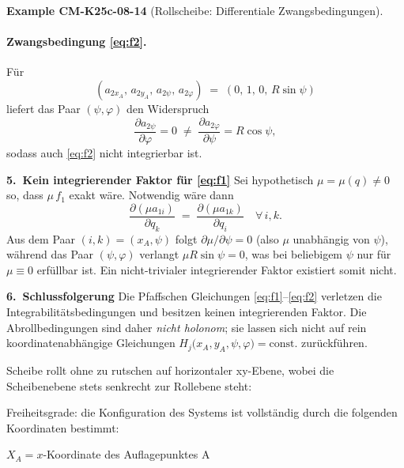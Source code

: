 \documentclass[10pt, letterpaper]{article}
\newcommand{\CustomHeading}[3]{%
  \par\medskip\noindent%
  \textbf{#1 #2} \textnormal{(#3)}.\enskip%
}
\newenvironment{EXA}[2]{\begin{unitbox}\CustomHeading{Example}{#1}{#2}}{\end{unitbox}}
\begin{document}
\begin{EXA}{CM-K25c-08-14}{Rollscheibe: Differentiale Zwangsbedingungen}
\paragraph{Zwangsbedingung \eqref{eq:f2}.}
Für
\[
  (a_{2x_A},\,a_{2y_A},\,a_{2\psi},\,a_{2\varphi})
  \;=\;
  (0,\,1,\,0,\,R\sin\psi)
\]
liefert das Paar $(\psi,\varphi)$ den Widerspruch
\[
  \frac{\partial a_{2\psi}}{\partial\varphi}=0
  \;\neq\;
  \frac{\partial a_{2\varphi}}{\partial\psi}=R\cos\psi,
\]
sodass auch \eqref{eq:f2} nicht integrierbar ist.

\textbf{5.\ Kein integrierender Faktor für \eqref{eq:f1}}
Sei hypothetisch $\mu=\mu(q)\neq0$ so, dass $\mu\,f_1$ exakt wäre.
Notwendig wäre dann
\[
  \frac{\partial(\mu a_{1i})}{\partial q_k}
  \;=\;
  \frac{\partial(\mu a_{1k})}{\partial q_i}
  \quad\forall\,i,k.
\]
Aus dem Paar $(i,k)=(x_A,\psi)$ folgt
$\partial\mu/\partial\psi = 0$ (also $\mu$ unabhängig von $\psi$),
während das Paar $(\psi,\varphi)$ verlangt
\(
  \mu R\sin\psi = 0
\),
was bei beliebigem $\psi$ nur für $\mu\equiv0$ erfüllbar ist.
Ein nicht-trivialer integrierender Faktor existiert somit nicht.

\textbf{6.\ Schlussfolgerung}
Die Pfaffschen Gleichungen \eqref{eq:f1}–\eqref{eq:f2} verletzen die
Integrabilitätsbedingungen und besitzen keinen integrierenden Faktor.
Die Abrollbedingungen sind daher \emph{nicht holonom};
sie lassen sich nicht auf rein
koordinatenabhängige Gleichungen
\(
  H_j\bigl(x_A,y_A,\psi,\varphi\bigr)=\text{const.}
\)
zurückführen.
\end{EXA}






Scheibe rollt ohne zu rutschen auf horizontaler xy-Ebene, wobei die Scheibenebene stets senkrecht zur Rollebene steht:

Freiheitsgrade: die Konfiguration des Systems ist vollständig durch die folgenden Koordinaten bestimmt:

$X_A = x$-Koordinate des Auflagepunktes A
\end{document}
